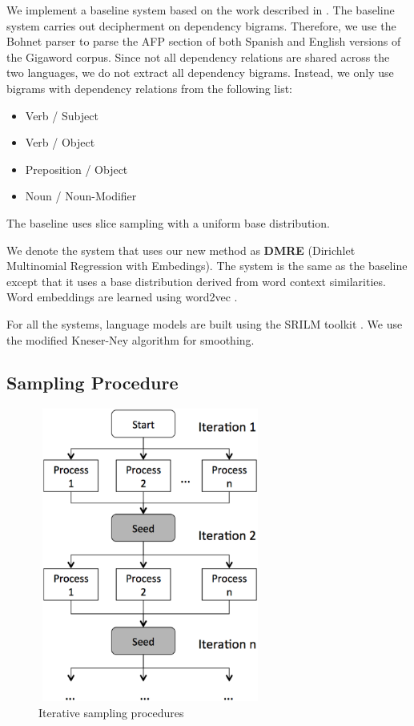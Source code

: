 We implement a baseline system based on the work described in . The baseline system carries out decipherment on dependency bigrams.  Therefore, we use the Bohnet parser \cite{bohnet:2010:PAPERS} to parse the AFP section of both Spanish and English versions of the Gigaword corpus. Since not all dependency relations are shared across the two languages, we do not extract all dependency bigrams. Instead, we only use bigrams with dependency relations from the following list: 

\begin{itemize}
\item Verb / Subject
\item Verb / Object
\item Preposition / Object
\item Noun / Noun-Modifier
\end{itemize}

The baseline uses slice sampling with a uniform base distribution.

We denote the system that uses our new method as \textbf{DMRE} (Dirichlet Multinomial Regression with Embedings). The system is the same as the baseline except that it uses a base distribution derived from word context similarities.  Word embeddings are learned using word2vec \cite{mikolov2013efficient}.

For all the systems, language models are built using the SRILM toolkit \cite{srilm}. We use the modified Kneser-Ney \cite{KneserNey95} algorithm for smoothing.


\subsection{Sampling Procedure}
\label{sample_procedure}

 \begin{figure}[!ht]
  \centering
  \includegraphics[width=2.9in,height=3.8in]{iterative_sampling}
  \caption{Iterative sampling procedures}
\label{iterative_sampling}
\end{figure}


